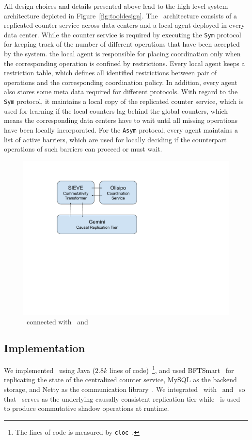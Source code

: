 All design choices and details presented above lead to the high level system architecture 
depicted in Figure~\ref{fig:tooldesign}. The \coordtool\ architecture consists of a replicated counter service across data centers and a local agent deployed
in every data center. While the counter service is required by executing the {\tt Sym} protocol
for keeping track of the number of different operations that have been accepted by the system.
the local agent is responsible for placing coordination only when the corresponding
operation is confined by restrictions. Every local agent keeps a restriction table, which defines
all identified restrictions between pair of operations and the corresponding coordination policy.
In addition, every agent also stores some meta data required for different protocols. With regard
to the {\tt Sym} protocol, it maintains a local copy of the replicated counter service, which is used
for learning if the local counters lag behind the global counters, which means
the corresponding data centers have to wait until all missing operations have been locally
incorporated. For the {\tt Asym} protocol, every agent maintains a list of active barriers, which
are used for locally deciding if the counterpart operations of such barriers can proceed or must wait.
\begin{figure}[t!]
\centering
\includegraphics[width=0.76\columnwidth]{./figures/tool_intergated.pdf}
\caption{\coordtool\ connected with \tool\ and \gemini}
\label{fig:toolwithenvironment}
\end{figure}
\fi
\subsection{Implementation}
We implemented \coordtool\ using Java ($2.8k$ lines of code)~\footnote{The lines of code is
measured by {\tt cloc}~\cite{codecounter}.}, and used BFTSmart~\cite{bftsmartcode} for replicating
the state of the centralized counter service, MySQL as the backend storage, and Netty
as the communication library~\cite{Netty}. We integrated \coordtool\ with \gemini\ and \tool\ so
that \gemini\ serves as the underlying causally consistent replication tier while \tool\ is used to
produce commutative shadow operations at runtime. 

